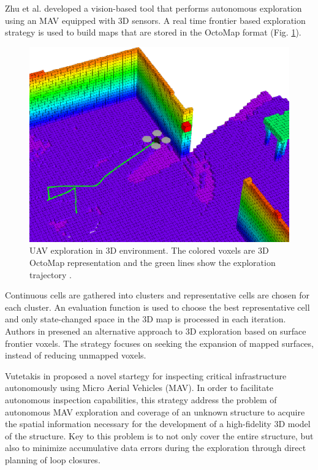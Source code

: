Zhu et al. \cite{Zhu2015} developed a vision-based tool that performs autonomous exploration using an MAV equipped with 3D sensors. A real time frontier based exploration strategy is used to build maps that are stored in the OctoMap format (Fig. \ref{fig:octomap}).

\begin{figure}[t!]
	\centering
	\includegraphics[width=1.0\columnwidth]{./pictures/octomap_and_drone.png}	
	\caption{UAV exploration in 3D environment. The colored voxels are 3D OctoMap representation and the green lines show the exploration trajectory \cite{Wang2019}.}
	\label{fig:octomap}
\end{figure}

Continuous cells are gathered into clusters and representative cells are chosen for each cluster. An evaluation function is used to choose the best representative cell and only state-changed space in the 3D map is processed in each iteration.
Authors in \cite{Senarathne2016} presened an alternative approach to 3D
exploration based on surface frontier voxels. The strategy focuses on seeking the expansion of mapped surfaces, instead of reducing unmapped voxels. 

Vutetakis in \cite{Vutetakis2019} proposed a novel startegy for inspecting
critical infrastructure autonomously using Micro Aerial Vehicles (MAV). In order to facilitate autonomous inspection capabilities, this strategy address the problem of autonomous MAV exploration and coverage of an unknown structure to acquire the spatial information necessary for the development of a high-fidelity 3D model of the structure. Key to this problem is to not only cover the entire structure, but also to minimize accumulative data errors during the exploration through direct planning of loop closures. 

